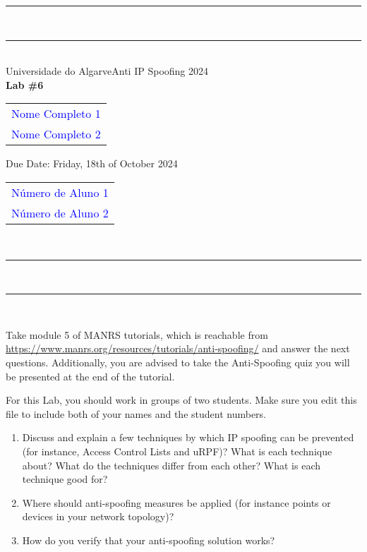 \documentclass{article} %
\begin{document}
\begin{center}
\rule{\textwidth}{.0075in} \\
\rule[3mm]{\textwidth}{.0075in}\\

Universidade do Algarve\hfill Anti IP Spoofing \hfill 2024\\[3ex]

{\Large\bf Lab \#6} \\[3ex]

\begin{tabular}{l}
\textcolor{blue}{Nome Completo 1} \\ \hfill 
\textcolor{blue}{Nome Completo 2} \hfill
\end{tabular}
 Due Date: Friday, 18th of October 2024 \hfill 
\begin{tabular}{l}
\textcolor{blue}{Número de Aluno 1} \\ \hfill 
\textcolor{blue}{Número de Aluno 2} \hfill
\end{tabular}\\

\rule{\textwidth}{.0075in} \\
\rule[3mm]{\textwidth}{.0075in} \\
\end{center}


Take module 5 of MANRS tutorials, which is reachable from 
\href{https://www.manrs.org/resources/tutorials/anti-spoofing/}{https://\-www.manrs.org/\-resources/\-tutorials/\-anti-\-spoofing/}
and answer the next questions. Additionally, you are advised to take the Anti-Spoofing quiz you
will be presented at the end of the tutorial.

For this Lab, you should work in groups of two students. Make sure you edit this file to include
both of your names and the student numbers.


\begin{enumerate}
\item Discuss and explain a few techniques by which IP spoofing can be prevented (for instance,
  Access Control Lists and uRPF)? What is each technique about? What do the techniques differ from
  each other? What is each technique good for?
\item Where should anti-spoofing measures be applied
  (for instance points or devices in your network topology)?
\item How do you verify that your anti-spoofing solution works?
\end{enumerate}  
\end{document}
